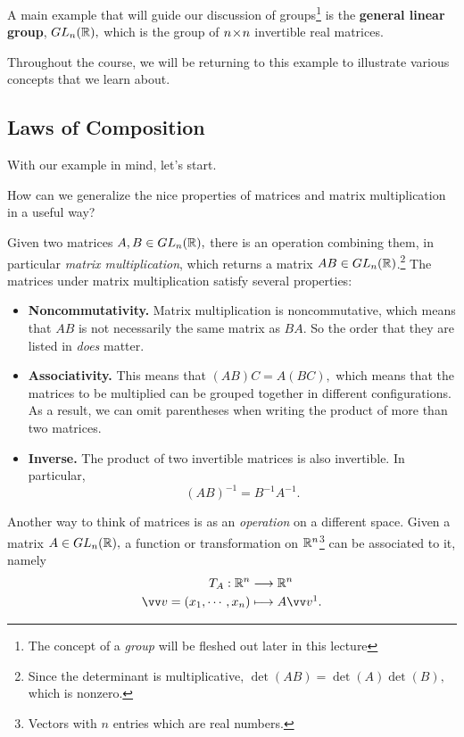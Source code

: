 \begin{example}[$GL_n(\RR)$]
A main example that will guide our discussion of groups\footnote{The concept of a \emph{group} will be fleshed out later in this lecture} is the \textbf{general linear group}, $GL_n(\mathbb R),$ which is the group of $n \hspace{0.05em}{\times}\hspace{0.05em} n$ invertible real matrices. 
\end{example}

Throughout the course, we will be returning to this example to illustrate various concepts that we learn about.

\subsection{Laws of Composition}
With our example in mind, let's start.
\begin{qq}
How can we generalize the nice properties of matrices and matrix multiplication in a useful way?
\end{qq}

Given two matrices $A, B \in GL_n(\mathbb R),$ there is an operation combining them, in particular \emph{matrix multiplication}, which returns a matrix $AB \in GL_n(\mathbb R)$.\footnote{Since the determinant is multiplicative, $\det(AB) = \det(A)\det(B),$ which is nonzero.} The matrices under matrix multiplication satisfy several properties:
\begin{itemize}
    \item \textbf{Noncommutativity.} Matrix multiplication is noncommutative, which means that $AB$ is not necessarily the same matrix as $BA.$ So the order that they are listed in \emph{does} matter.
    \item \textbf{Associativity.} This means that $(AB)C = A(BC),$ which means that the matrices to be multiplied can be grouped together in different configurations. As a result, we can omit parentheses when writing the product of more than two matrices.
    
    \item \textbf{Inverse.} The product of two invertible matrices is also invertible. In particular, 
    \[
    (AB)^{-1} = B^{-1}A^{-1}.
    \]
\end{itemize}

Another way to think of matrices is as an \emph{operation} on a different space. Given a matrix $A \in GL_n(\mathbb R),$ a function or transformation on $\mathbb R^n$\footnote{Vectors with $n$ entries which are real numbers.} can be associated to it, namely 
\begin{align*}
    T_A: \RR^n &\rto \RR^n \\
    \vvv = (x_1, \cdots, x_n) &\mto A\vvv \footnotemark.
\end{align*}

